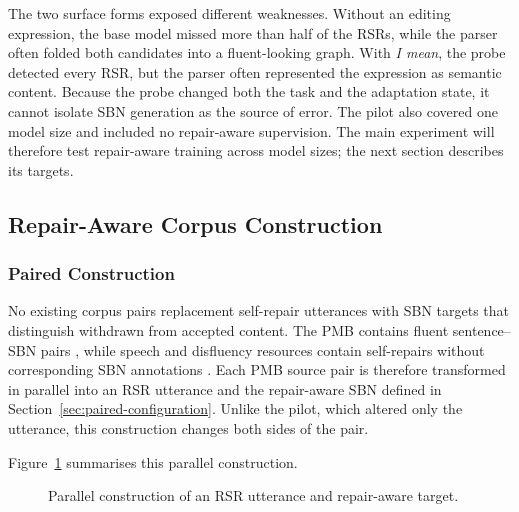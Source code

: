 The two surface forms exposed different weaknesses. Without an editing expression,
the base model missed more than half of the RSRs, while the parser often folded
both candidates into a fluent-looking graph. With \textit{I mean}, the probe
detected every RSR, but the parser often represented the expression as semantic
content. Because the probe changed both the task and the adaptation state, it
cannot isolate SBN generation as the source of error. The pilot also covered
one model size and included no repair-aware supervision. The main experiment
will therefore test repair-aware training across model sizes; the next section
describes its targets.

\subsection{Repair-Aware Corpus Construction}
\label{sec:data}

\subsubsection{Paired Construction}

No existing corpus pairs replacement self-repair utterances with SBN targets
that distinguish withdrawn from accepted content. The PMB contains fluent
sentence--SBN pairs \citep{abzianidzeParallelMeaningBank2017}, while speech and
disfluency resources contain self-repairs without corresponding SBN annotations
\citep{deshmukhResegmentationSWITCHBOARD1998,
passaliLARDLargescaleArtificial2022,guptaDisflQABenchmarkDataset2021}. Each PMB
source pair is therefore transformed in parallel into an RSR utterance and the
repair-aware SBN defined in Section~\ref{sec:paired-configuration}. Unlike the
pilot, which altered only the utterance, this construction changes both sides
of the pair.

Figure~\ref{fig:paired-transformation} summarises this parallel construction.

\begin{figure}[ht]
\centering
{}
\caption{Parallel construction of an RSR utterance and repair-aware target.}
\label{fig:paired-transformation}
\end{figure}


